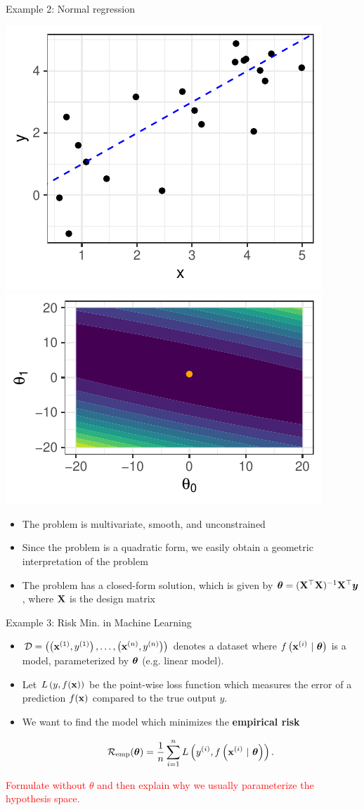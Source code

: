 \begin{vbframe}{Example 2: Normal regression}

\begin{center}
	\includegraphics[height=0.30\textwidth, keepaspectratio]{figure_man/ml_linreg_example_1.pdf} ~~ \includegraphics[height=0.30\textwidth, keepaspectratio]{figure_man/ml_linreg_example_2.pdf}
\end{center}

\begin{itemize}
	\item The problem is multivariate, smooth, and unconstrained
	\item Since the problem is a quadratic form, we easily obtain a geometric interpretation of the problem 
	\item The problem has a closed-form solution, which is given by $\bm{\theta} = (\mathbf{X}^\top \mathbf{X})^{-1}\mathbf{X}^\top \bm{y}$, where $\mathbf{X}$ is the design matrix
\end{itemize}

\end{vbframe}

\begin{frame}{Example 3: Risk Min. in Machine Learning}
	
	
\begin{itemize}
	\item $\mathcal{D} = \left( \left(\mathbf{x}^{(1)}, y^{(1)}\right), \ldots, \left(\mathbf{x}^{(n)}, y^{(n)}\right)\right)$ denotes a dataset 
	where $f\left(\mathbf{x}^{(i)} ~|~ \bm{\theta}\right)$ is a model, parameterized by $\bm{\theta}$ (e.g. linear model).
	\item Let $L\left(y, f(\mathbf{x})\right)$ be the point-wise loss function which measures the error of a prediction $f(\mathbf{x})$ compared to the true output $y$.
	\item We want to find the model which minimizes the \textbf{empirical risk}
	
	$$
	\mathcal{R}_{\text{emp}}(\bm{\theta}) = \frac{1}{n} \sum\limits_{i=1}^n L\left(y^{(i)}, f\left(\mathbf{x}^{(i)} ~|~ \bm{\theta}\right)\right).
	$$
\end{itemize}

\textcolor{red}{Formulate without $\theta$ and then explain why we usually parameterize the hypothesis space. }

\end{frame}	

